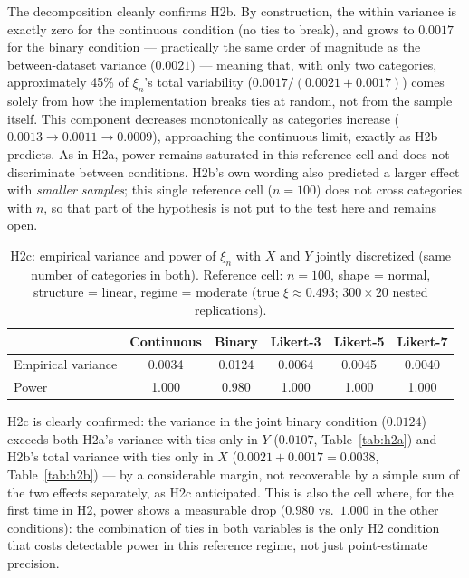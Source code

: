 \documentclass[article]{ajs}
\begin{document}
The decomposition cleanly confirms H2b. By construction, the within
variance is exactly zero for the continuous condition (no ties to
break), and grows to $0.0017$ for the binary condition --- practically
the same order of magnitude as the between-dataset variance
($0.0021$) --- meaning that, with only two categories, approximately
45\% of $\xi_n$'s total variability ($0.0017/(0.0021+0.0017)$) comes
solely from how the implementation breaks ties at random, not from the
sample itself. This component
decreases monotonically as categories increase
($0.0013 \to 0.0011 \to 0.0009$), approaching the continuous limit,
exactly as H2b predicts. As in H2a, power remains saturated in this
reference cell and does not discriminate between conditions. H2b's own
wording also predicted a larger effect with \emph{smaller samples}; this
single reference cell ($n=100$) does not cross categories with $n$, so
that part of the hypothesis is not put to the test here and remains
open.

\begin{table}[H]
\caption{\label{tab:h2c}H2c: empirical variance and power of $\xi_n$ with $X$ and $Y$ jointly discretized (same number of categories in both). Reference cell: $n=100$, shape = normal, structure = linear, regime = moderate (true $\xi \approx 0.493$; $300 \times 20$ nested replications).}
\begin{center}
\begin{tabular}{lccccc}
\toprule
 & Continuous & Binary & Likert-3 & Likert-5 & Likert-7 \\
\midrule
Empirical variance & 0.0034 & 0.0124 & 0.0064 & 0.0045 & 0.0040 \\
Power          & 1.000  & 0.980  & 1.000  & 1.000  & 1.000  \\
\bottomrule
\end{tabular}
\end{center}
\end{table}

H2c is clearly confirmed: the variance in the joint binary condition
($0.0124$) exceeds both H2a's variance with ties only in $Y$
($0.0107$, Table~\ref{tab:h2a}) and H2b's total variance with ties
only in $X$ ($0.0021+0.0017=0.0038$, Table~\ref{tab:h2b}) --- by a
considerable margin, not recoverable by a simple sum of the two
effects separately, as H2c anticipated. This is also the cell where,
for the first time in H2, power shows a measurable drop ($0.980$ vs.\
$1.000$ in the other conditions): the combination of ties in both
variables is the only H2 condition that costs detectable power in this
reference regime, not just point-estimate precision.
\end{document}
